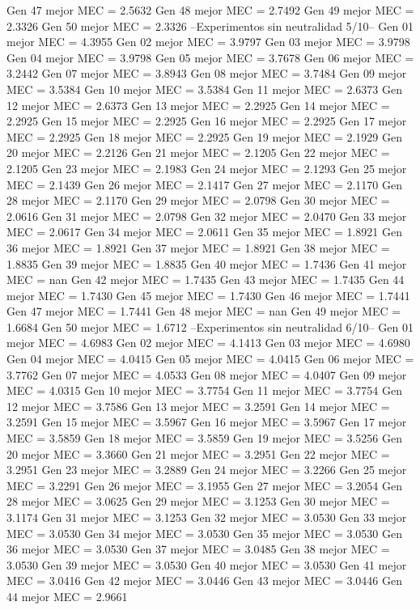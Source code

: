 Gen 47 mejor MEC = 2.5632
Gen 48 mejor MEC = 2.7492
Gen 49 mejor MEC = 2.3326
Gen 50 mejor MEC = 2.3326
--Experimentos sin neutralidad 5/10--
Gen 01 mejor MEC = 4.3955
Gen 02 mejor MEC = 3.9797
Gen 03 mejor MEC = 3.9798
Gen 04 mejor MEC = 3.9798
Gen 05 mejor MEC = 3.7678
Gen 06 mejor MEC = 3.2442
Gen 07 mejor MEC = 3.8943
Gen 08 mejor MEC = 3.7484
Gen 09 mejor MEC = 3.5384
Gen 10 mejor MEC = 3.5384
Gen 11 mejor MEC = 2.6373
Gen 12 mejor MEC = 2.6373
Gen 13 mejor MEC = 2.2925
Gen 14 mejor MEC = 2.2925
Gen 15 mejor MEC = 2.2925
Gen 16 mejor MEC = 2.2925
Gen 17 mejor MEC = 2.2925
Gen 18 mejor MEC = 2.2925
Gen 19 mejor MEC = 2.1929
Gen 20 mejor MEC = 2.2126
Gen 21 mejor MEC = 2.1205
Gen 22 mejor MEC = 2.1205
Gen 23 mejor MEC = 2.1983
Gen 24 mejor MEC = 2.1293
Gen 25 mejor MEC = 2.1439
Gen 26 mejor MEC = 2.1417
Gen 27 mejor MEC = 2.1170
Gen 28 mejor MEC = 2.1170
Gen 29 mejor MEC = 2.0798
Gen 30 mejor MEC = 2.0616
Gen 31 mejor MEC = 2.0798
Gen 32 mejor MEC = 2.0470
Gen 33 mejor MEC = 2.0617
Gen 34 mejor MEC = 2.0611
Gen 35 mejor MEC = 1.8921
Gen 36 mejor MEC = 1.8921
Gen 37 mejor MEC = 1.8921
Gen 38 mejor MEC = 1.8835
Gen 39 mejor MEC = 1.8835
Gen 40 mejor MEC = 1.7436
Gen 41 mejor MEC = nan
Gen 42 mejor MEC = 1.7435
Gen 43 mejor MEC = 1.7435
Gen 44 mejor MEC = 1.7430
Gen 45 mejor MEC = 1.7430
Gen 46 mejor MEC = 1.7441
Gen 47 mejor MEC = 1.7441
Gen 48 mejor MEC = nan
Gen 49 mejor MEC = 1.6684
Gen 50 mejor MEC = 1.6712
--Experimentos sin neutralidad 6/10--
Gen 01 mejor MEC = 4.6983
Gen 02 mejor MEC = 4.1413
Gen 03 mejor MEC = 4.6980
Gen 04 mejor MEC = 4.0415
Gen 05 mejor MEC = 4.0415
Gen 06 mejor MEC = 3.7762
Gen 07 mejor MEC = 4.0533
Gen 08 mejor MEC = 4.0407
Gen 09 mejor MEC = 4.0315
Gen 10 mejor MEC = 3.7754
Gen 11 mejor MEC = 3.7754
Gen 12 mejor MEC = 3.7586
Gen 13 mejor MEC = 3.2591
Gen 14 mejor MEC = 3.2591
Gen 15 mejor MEC = 3.5967
Gen 16 mejor MEC = 3.5967
Gen 17 mejor MEC = 3.5859
Gen 18 mejor MEC = 3.5859
Gen 19 mejor MEC = 3.5256
Gen 20 mejor MEC = 3.3660
Gen 21 mejor MEC = 3.2951
Gen 22 mejor MEC = 3.2951
Gen 23 mejor MEC = 3.2889
Gen 24 mejor MEC = 3.2266
Gen 25 mejor MEC = 3.2291
Gen 26 mejor MEC = 3.1955
Gen 27 mejor MEC = 3.2054
Gen 28 mejor MEC = 3.0625
Gen 29 mejor MEC = 3.1253
Gen 30 mejor MEC = 3.1174
Gen 31 mejor MEC = 3.1253
Gen 32 mejor MEC = 3.0530
Gen 33 mejor MEC = 3.0530
Gen 34 mejor MEC = 3.0530
Gen 35 mejor MEC = 3.0530
Gen 36 mejor MEC = 3.0530
Gen 37 mejor MEC = 3.0485
Gen 38 mejor MEC = 3.0530
Gen 39 mejor MEC = 3.0530
Gen 40 mejor MEC = 3.0530
Gen 41 mejor MEC = 3.0416
Gen 42 mejor MEC = 3.0446
Gen 43 mejor MEC = 3.0446
Gen 44 mejor MEC = 2.9661
